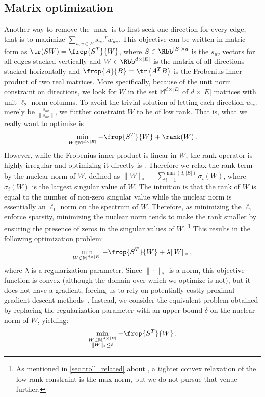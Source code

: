 \subsection{Matrix optimization}
\label{sub:edge_matrix}

Another way to remove the $\max$ is to first seek one direction for every edge, that is to maximize
$\sum_{u,v\in E} {s_{uv}}^T w_{uv}$. This objective can be written in matric form as $\tr(SW) =
\frop{S^T}{W}$, where $S \in \Rbb^{|E| \times d}$ is the $s_{uv}$ vectors for all edges stacked
vertically and $W \in \Rbb^{d \times |E|}$ is the matrix of all directions stacked horizontally
and $\frop{A}{B} = \tr\left(A^T B\right)$ is the Frobenius inner product of two real matrices.
More specifically, because of the unit norm constraint on directions, we look for $W$ in the set
$\mathbb{M}^{d\times |E|}$ of $d\times |E|$ matrices with unit $\ell_2$ norm columns. To avoid the
trivial solution of letting each direction $w_{uv}$ merely be $\frac{s_{uv}}{\|s_{uv}\|}$, we
further constraint $W$ to be of low rank. That is, what we really want to optimize is \[\min_{W\in
\mathbb{M}^{d\times |E|}} -\frop{S^T}{W} + \rank(W)\,.\] However, while the Frobenius inner product is
linear in $W$, the rank operator is highly irregular and optimizing it directly is \NPc{}. Therefore
we relax the rank term by the nuclear norm of $W$, defined as $\|W\|_* = \sum_{i=1}^{\min(d,|E|)}
\sigma_i(W)$, where $\sigma_i(W)$ is the \ith{} largest singular value of $W$. The intuition is
that the rank of $W$ is
equal to the number of non-zero singular value while the nuclear norm is essentially an $\ell_1$ norm on
the spectrum of $W$. Therefore, as minimizing the $\ell_1$ enforce sparsity, minimizing the nuclear
norm tends to make the rank smaller by ensuring the presence of zeros in the singular values of $W$.
\footnote{As mentioned in \autoref{sec:troll_related} about \autocite{OnlineCompletion17}, a tighter
convex relaxation of the low-rank constraint is the max norm, but we do not pursue that venue
further.} This
results in the following optimization problem: \[\min_{W\in \mathbb{M}^{d\times |E|}} -\frop{S^T}{W}
+ \lambda \|W\|_*\,,\] where $\lambda$ is a regularization parameter. Since $\|\cdot\|_*$ is a norm, this
objective function is convex (although the domain over which we optimize is not), but it does not
have a gradient, forcing us to rely on potentially costly proximal gradient descent
methods~\autocite{Parikh2013a}. Instead, we consider the equivalent problem obtained by replacing
the regularization parameter with an upper bound $\delta$ on the nuclear norm of $W$, yielding:
\begin{equation*}
  \min_{\substack{W\in \mathbb{M}^{d\times |E|} \\ \|W\|_* \leq \delta}} -\frop{S^T}{W}\,.
\end{equation*}

